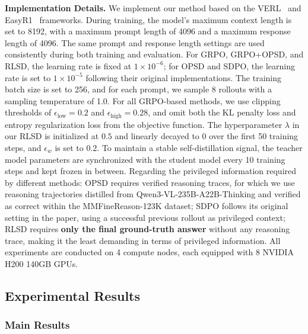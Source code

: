 \documentclass[]{jingdong}
\begin{document}
\noindent \textbf{Implementation Details.}
We implement our method based on the VERL~\citep{verl} and EasyR1~\citep{easyr1} frameworks. 
During training, the model's maximum context
length is set to 8192, with a maximum prompt length of 4096 and a maximum response length of
4096.
The same prompt and response length settings are used consistently during both training and evaluation. For GRPO, GRPO+OPSD, and RLSD, the learning rate is fixed at $1 \times 10^{-6}$; for OPSD and SDPO, the learning rate is set to $1 \times 10^{-5}$ following their original implementations. The training batch size is set to 256, and for each prompt, we sample 8 rollouts with a sampling temperature of 1.0. For all GRPO-based methods, we use clipping thresholds of $\epsilon_{\text{low}} = 0.2$ and $\epsilon_{\text{high}} = 0.28$, and omit both the KL penalty loss and entropy regularization loss from the objective function. The hyperparameter $\lambda$ in our RLSD is initialized at $0.5$ and linearly decayed to 0 over the first 50 training steps, and $\epsilon_w$ is set to $0.2$. To maintain a stable self-distillation signal, the teacher model parameters are synchronized with the student model every 10 training steps and kept frozen in between. Regarding the privileged information required by different methods: OPSD requires verified reasoning traces, for which we use reasoning trajectories distilled from Qwen3-VL-235B-A22B-Thinking and verified as correct within the MMFineReason-123K dataset; SDPO follows its original setting in the paper, using a successful previous rollout as privileged context; RLSD requires \textbf{only the final ground-truth answer} without any reasoning trace, making it the least demanding in terms of privileged information. All experiments are conducted on 4 compute nodes, each equipped with 8 NVIDIA H200 140GB GPUs.

\subsection{Experimental Results}

\subsubsection{Main Results}
\label{sec:main-results}
\end{document}
